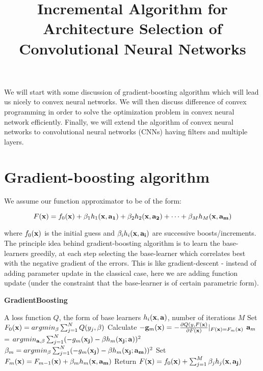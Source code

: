 \documentclass{article}
\title{Incremental Algorithm for Architecture Selection of Convolutional Neural Networks}
\begin{document}
\maketitle

We will start with some discussion of gradient-boosting algorithm which will lead us nicely to convex neural networks. We will then discuss difference of convex programming in order to solve the optimization problem in convex neural network efficiently. Finally, we will extend the algorithm of convex neural networks to convolutional neural networks (CNNs) having filters and multiple layers.

\section{Gradient-boosting algorithm}
\label{sec:grad_boosting}
We assume our function approximator to be of the form:

\begin{equation}
	F({\bf x}) = f_0({\bf x}) + \beta_1 h_1({\bf x, a_1}) + \beta_2 h_2({\bf x, a_2}) + \dots + \beta_M h_M({\bf x, a_m})  
\end{equation}

where $f_0({\bf x})$ is the initial guess and $\beta_i h_i({\bf x, a_i})$ are successive boosts/increments. The principle idea behind gradient-boosting algorithm is to learn the base-learners greedily, at each step selecting the base-learner which correlates best with the negative gradient of the errors. This is like gradient-descent - instead of adding parameter update in the classical case, here we are adding function update (under the constraint that the base-learner is of certain parametric form).

\begin{algorithm}
\caption{{\bf GradientBoosting} \cite{friedman2001greedy}}\label{algo:gradient_boosting}
\begin{algorithmic}[1]
 A loss function $Q$, the form of base learners $h_{i}({\bf x, a})$, number of iterations $M$
\STATE Set $F_0({\bf x}) = argmin_{\beta}  \sum_{j = 1}^{N} Q(y_j, \beta)$
\STATE Calculate $-{\bf g}_m({\bf x}) = - \frac{\partial Q(y, F{\bf(x)}}{\partial F{\bf(x)}}|_{F({\bf x}) = F_m({\bf x})}$
\STATE ${\bf a}_m$ = $argmin_{{\bf a}, \beta} \sum_{j = 1}^{N} (- g_m({\bf x_j}) - \beta h_m({\bf x_j;a}))^2$
\STATE $\beta_m = argmin_{\beta}  \sum_{j = 1}^{N} (- g_m({\bf x_j}) - \beta h_m({\bf x_j;a_m}))^2$
\STATE Set $F_m({\bf x}) = F_{m - 1}({\bf x}) + \beta_m h_m({\bf x, a_m})$
\ENDFOR
\STATE Return $F({\bf x}) = f_0({\bf x}) + \sum_{j = 1}^{M} \beta_j h_j({\bf x, a_j})$
\end{algorithmic}
\end{algorithm}
\end{document}
